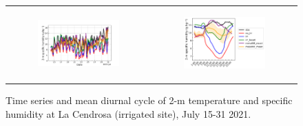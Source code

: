 \begin{figure}[hbtp]
\begin{tabular}{cc}
        \begin{subfigure}[t]{0.5\textwidth}
            \caption{}
            \includegraphics[width=\textwidth]{images/chap5/time_series_cendrosa_q2m.png}
        \end{subfigure} &
        \begin{subfigure}[t]{0.5\textwidth}
            \caption{}
            \includegraphics[width=\textwidth]{images/chap5/diurnal_cycle_cendrosa_q2m.png}
        \end{subfigure} \\
    \end{tabular}
    \caption{Time series and mean diurnal cycle of 2-m temperature and specific humidity at La Cendrosa (irrigated site), July 15-31 2021.}
\end{figure}

